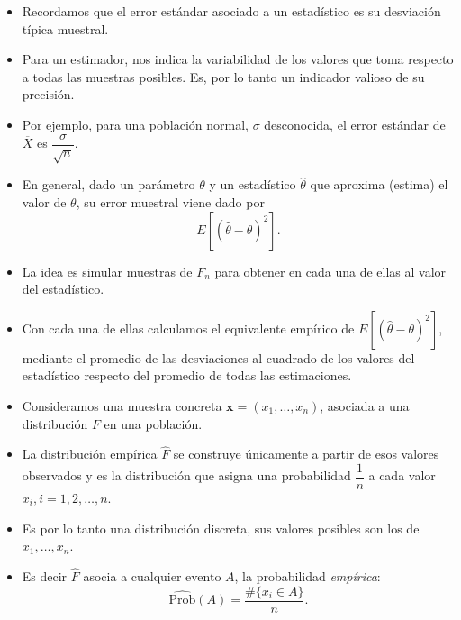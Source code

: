 \begin{tcolorbox}[colback=blue!5!white, colframe=blue!75!black, title=\textbf{Determinación del error muestral de un estadístico}]
\begin{itemize}[label=\textbullet]
    \item Recordamos que el error estándar asociado a un estadístico es su desviación típica muestral.
    \item Para un estimador, nos indica la variabilidad de los valores que toma respecto a todas las muestras posibles. Es, por lo tanto un indicador valioso de su precisión.
    \item Por ejemplo, para una población normal, $\sigma$ desconocida, el error estándar de $\overline{X}$ es $\dfrac{\sigma}{\sqrt{n} }$.
    \item En general, dado un parámetro $\theta$ y un estadístico $\hat{\theta}$ que aproxima (estima) el valor de $\theta$, su error muestral viene dado por \[
            E[(\hat{\theta}-\theta)^2].
    \] 
    \item La idea es simular muestras de $F_n$ para obtener en cada una de ellas al valor del estadístico.
    \item Con cada una de ellas calculamos el equivalente empírico de $E[(\hat{\theta}-\theta)^2]$, mediante el promedio de las desviaciones al cuadrado de los valores del estadístico respecto del promedio de todas las estimaciones.
\end{itemize}
\end{tcolorbox}
\begin{tcolorbox}[colback=blue!5!white, colframe=blue!75!black, title=\textbf{La distribución empírica asociada a una muestra}]
\begin{itemize}[label=\textbullet]
    \item Consideramos una muestra concreta $\mathbf{x}=(x_1,\dots,x_n)$, asociada a una distribución $F$ en una población.
    \item La distribución empírica $\hat{F}$ se construye únicamente a partir de esos valores observados y es la distribución que asigna una probabilidad $\dfrac{1}{n}$ a cada valor $x_i,i=1,2,\dots,n$.
    \item Es por lo tanto una distribución discreta, sus valores posibles son los de $x_1,\dots,x_n$.
    \item Es decir $\hat{F}$ asocia a cualquier evento $A$, la probabilidad \textit{empírica}: \[
    \hat{\mathrm{Prob}}(A)=\dfrac{\#\{x_i\in A\} }{n}.
    \]  
\end{itemize}
\end{tcolorbox}
